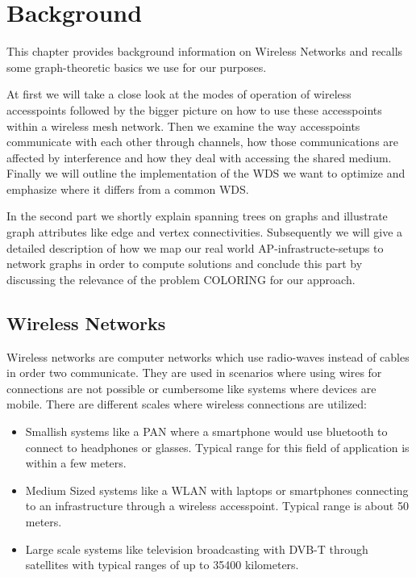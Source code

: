 \chapter{Background}
This chapter provides background information on Wireless Networks and recalls some graph-theoretic basics we use for our purposes.

At first we will take a close look at the modes of operation of wireless accesspoints followed by the bigger picture on how to use these accesspoints
within a wireless mesh network. Then we examine the way accesspoints communicate with each other through channels, how those communications are affected by interference and
how they deal with accessing the shared medium. Finally we will outline the implementation of the \ac{WDS} we want to optimize and emphasize where it differs from a common
\ac{WDS}.

In the second part we shortly explain spanning trees on graphs and illustrate graph attributes like edge and vertex connectivities.
Subsequently we will give a detailed description of how we map our real world \ac{AP}-infrastructe-setups to network graphs in order to compute solutions and conclude this part by
discussing the relevance of the problem COLORING for our approach.

\section{Wireless Networks}
  Wireless networks are computer networks which use radio-waves instead of cables in order two communicate.
  They are used in scenarios where using wires for connections are not possible or cumbersome like systems where devices are mobile.
  There are different scales where wireless connections are utilized:
    \begin{itemize}
      \item Smallish systems like a \ac{PAN} where a smartphone would use bluetooth to connect to headphones or glasses. Typical range for this field of
	application is within a few meters.
      \item Medium Sized systems like a \ac{WLAN} with laptops or smartphones connecting to an infrastructure through a wireless accesspoint.
	Typical range is about 50 meters.
      \item Large scale systems like television broadcasting with \ac{DVB-T} through satellites with typical ranges of up to 35400 kilometers.
    \end{itemize}

